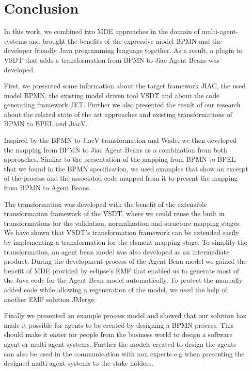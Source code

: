 \chapter{Conclusion}
\label{chap:conclusion}
In this work, we combined two MDE approaches in the domain of multi-agent-systems and brought the benefits of the expressive model BPMN and the developer friendly Java programming language together. As a result, a plugin to VSDT that adds a transformation from BPMN to Jiac Agent Beans was developed. 

First, we presented some information about the target framework JIAC, the used model BPMN, the existing model driven tool VSDT and about the code generating framework JET.  Further we also presented the result of our research about the related state of the art approaches and existing transformations of BPMN to BPEL and JiacV. 

Inspired by the BPMN to JiacV transformation and Wade, we then developed the mapping from BPMN to Jiac Agent Beans as a combination from both approaches. Similar to the presentation of the mapping from BPMN to BPEL that we found in the BPMN specification, we used examples that show an excerpt of the process and the associated code mapped from it to present the mapping from BPMN to Agent Beans. 

The transformation was developed with the benefit of the extensible transformation framework of the VSDT, where we could reuse the built in transformations for the validation, normalization and structure mapping stages. We have shown that VSDT's transformation framework can be extended easily by implementing a transformation for the element mapping stage. To simplify the transformation, an agent bean model was also developed as an intermediate product. During the development process of the Agent Bean model we gained the benefit of MDE provided by eclipse's EMF that enabled us to generate most of the Java code for the Agent Bean model automatically.
To protect the manually added code while allowing a regeneration of the model, we used the help of another EMF solution JMerge.
 
Finally we presented an example process model and showed that our solution has made it possible for agents to be created by designing a BPMN process. This should make it easier for people from the business world to design a software agent or multi agent systems. Further the models created to design the agents can also be used in the communication with non experts e.g when presenting the designed multi agent systems to the stake holders.

